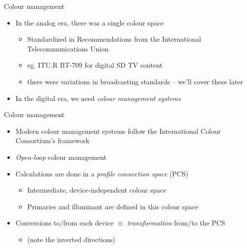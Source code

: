 \documentclass[aspectratio=169,handout,usepdftitle=false]{fireshonks}
\begin{document}
\begin{frame}{Colour management}
    \begin{itemize}
        \item In the analog era, there was a single colour space
              \begin{itemize}
                  \item Standardized in Recommendations from the International Telecommunications Union
                  \item eg. ITU.R BT-709 \parencite*{BT709} for digital SD TV content
                  \item there were variations in broadcasting standards -- we'll cover these later
              \end{itemize}
        \item In the digital era, we need \emph{colour management systems}
    \end{itemize}
\end{frame}
\begin{frame}{Colour management}
    \begin{itemize}
        \item Modern colour management systems follow the International Colour Consortium's framework \autocite{allen}
        \item \emph{Open-loop} colour management
        \item Calculations are done in a \emph{profile connection space} (PCS)
              \begin{itemize}
                  \item Intermediate, device-independent colour space
                  \item Primaries and illuminant are defined in this colour space
              \end{itemize}
        \item Conversions to/from each device $\equiv$ \emph{transformation} from/to the PCS
              \begin{itemize}
                  \item (note the inverted directions)
              \end{itemize}
    \end{itemize}
\end{frame}
\end{document}
